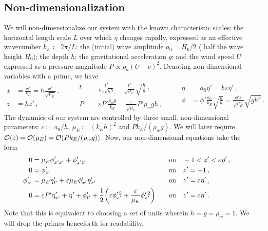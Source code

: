\documentclass{jfm}
\renewcommand*{\epsilon}{\varepsilon}
\begin{document}
\subsection{\label{sec:nondim} Non-dimensionalization}
We will non-dimensionalize our system with the known characteristic
scales: the horizontal length scale $L$ over which $\eta$ changes
rapidly, expressed as an effective wavenumber $k_E \coloneqq 2 \pi/L$;
the (initial) wave amplitude $a_0 = H_0/2$ (\ie{} half the wave height
$H_0$); the depth $h$; the gravitational acceleration $g$; and the wind
speed $U$ expressed as a pressure magnitude $P \propto \rho_a (U-c)^2$.
Denoting non-dimensional variables with a prime, we have
\begin{equation*}
  \begin{aligned}
  x &= \frac{x'}{k_E} = h \frac{x'}{\sqrt{\mu_E}}\,, \\
  z &= h z' \,,
  \end{aligned}
  \qquad
  \begin{aligned}
  t &= \frac{t'}{k_E\sqrt{g h}}
    = \frac{t'}{\sqrt{\mu_E}} \sqrt{\frac{h}{g}} \,, \\
  P &= \epsilon P' \frac{\rho_w g}{k_E}
    = \frac{\epsilon}{\sqrt{\mu_E}} P' \rho_w g h \,,
  \end{aligned}
  \qquad
  \begin{aligned}
  \eta &= a_0 \eta' = h \epsilon \eta' \,, \\
  \phi &= \phi'\frac{a_0}{k_E}\sqrt{\frac{g}{h}}
    = \frac{\phi'\epsilon}{\sqrt{\mu_E}}\sqrt{g h^3} \,.
  \end{aligned}
\end{equation*}
The dynamics of our system are controlled by three small,
non-dimensional parameters: $\epsilon \coloneqq a_0/h$, $\mu_E \coloneqq
(k_E h)^2$ and $P k_E/(\rho_w g)$.
We will later require $\order{\epsilon} = \order{\mu_E} =
\order{Pk_E/(\rho_w g)}$.
Now, our non-dimensional equations take the form
\begin{alignat}{2}
  0 &= \mu_E \phi'_{x'x'} + \phi'_{z'z'} &&\qq{on}
    -1 < z' < \epsilon \eta' \,, \label{eq:laplace_nondim} \\
  0 &= \phi'_{z'} &&\qq{on} z'=-1 \,, \label{eq:bottom_bc_nondim} \\
  \phi'_{z'} &= \mu_E \eta'_{t'} +
    \epsilon \mu_E \phi'_{x'} \eta'_{x'} &&\qq{on} z' = \epsilon \eta' \,,
    \label{eq:kinematic_bc_nondim} \\
  0 &= \epsilon P' \eta'_{x'} +  \eta' + \phi'_{t'} + \frac{1}{2}
    \pqty{\epsilon \phi_{x'}^{\prime \, 2} + \frac{\epsilon}{\mu_E}
    \phi_{z'}^{\prime \, 2}} &&\qq{on} z'= \epsilon \eta' \,.
    \label{eq:dynamic_bc_nondim}
\end{alignat}
Note that this is equivalent to choosing a set of units wherein $h = g =
\rho_w = 1$.
We will drop the primes henceforth for readability.
\end{document}
